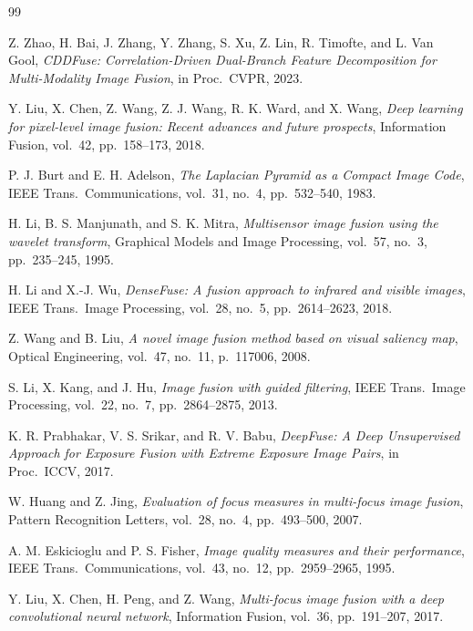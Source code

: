 \documentclass[12pt,a4paper]{article}
\begin{document}
\begin{thebibliography}{99}

Z. Zhao, H. Bai, J. Zhang, Y. Zhang, S. Xu, Z. Lin, R. Timofte, and L. Van Gool, \emph{CDDFuse: Correlation-Driven Dual-Branch Feature Decomposition for Multi-Modality Image Fusion}, in Proc.\ CVPR, 2023.

Y. Liu, X. Chen, Z. Wang, Z. J. Wang, R. K. Ward, and X. Wang, \emph{Deep learning for pixel-level image fusion: Recent advances and future prospects}, Information Fusion, vol.\ 42, pp.\ 158--173, 2018.

P. J. Burt and E. H. Adelson, \emph{The Laplacian Pyramid as a Compact Image Code}, IEEE Trans.\ Communications, vol.\ 31, no.\ 4, pp.\ 532--540, 1983.

H. Li, B. S. Manjunath, and S. K. Mitra, \emph{Multisensor image fusion using the wavelet transform}, Graphical Models and Image Processing, vol.\ 57, no.\ 3, pp.\ 235--245, 1995.

H. Li and X.-J. Wu, \emph{DenseFuse: A fusion approach to infrared and visible images}, IEEE Trans.\ Image Processing, vol.\ 28, no.\ 5, pp.\ 2614--2623, 2018.

Z. Wang and B. Liu, \emph{A novel image fusion method based on visual saliency map}, Optical Engineering, vol.\ 47, no.\ 11, p.\ 117006, 2008.

S. Li, X. Kang, and J. Hu, \emph{Image fusion with guided filtering}, IEEE Trans.\ Image Processing, vol.\ 22, no.\ 7, pp.\ 2864--2875, 2013.

K. R. Prabhakar, V. S. Srikar, and R. V. Babu, \emph{DeepFuse: A Deep Unsupervised Approach for Exposure Fusion with Extreme Exposure Image Pairs}, in Proc.\ ICCV, 2017.

W. Huang and Z. Jing, \emph{Evaluation of focus measures in multi-focus image fusion}, Pattern Recognition Letters, vol.\ 28, no.\ 4, pp.\ 493--500, 2007.

A. M. Eskicioglu and P. S. Fisher, \emph{Image quality measures and their performance}, IEEE Trans.\ Communications, vol.\ 43, no.\ 12, pp.\ 2959--2965, 1995.

Y. Liu, X. Chen, H. Peng, and Z. Wang, \emph{Multi-focus image fusion with a deep convolutional neural network}, Information Fusion, vol.\ 36, pp.\ 191--207, 2017.


\end{thebibliography}
\end{document}
